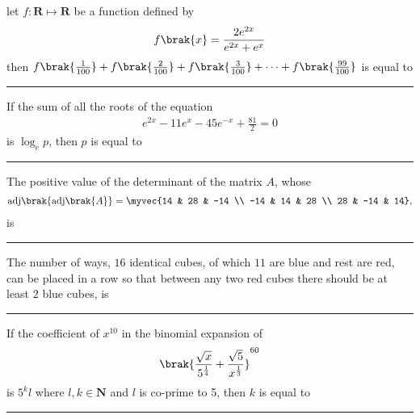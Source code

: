 \iffalse
\title{Assignment-2}
\author{EE24BTECH11049-Patnam Shariq Faraz Muhammed}
\section{integer}
\fi

%

    \item 
    let $f: \mathbf{R} \mapsto \mathbf{R}$ be a function defined by 
    \begin{align*}
        f\brak{x} = \frac{2e^{2x}}{e^{2x} + e^{x}}
    \end{align*}
    then $f\brak{\frac{1}{100}} + f\brak{\frac{2}{100}} + f\brak{\frac{3}{100}} + \dots + f\brak{\frac{99}{100}}$ is equal to \rule{1cm}{0.1pt}

    \hfill{}

    \item
    If the sum of all the roots of the equation 
    \begin{align*}
        e^{2x} - 11e^x - 45e^{-x} +\frac{81}{2}=0
    \end{align*}
    is $\log_e p$, then $p$ is equal to \rule{1cm}{0.1pt}

    \hfill{}

    \item 
    The positive value of the determinant of the matrix $A$, whose
    \begin{align*}
        \text{adj}\brak{\text{adj}\brak{A}} = \myvec{14 & 28 & -14 \\ -14 & 14 & 28 \\ 28 & -14 & 14},
    \end{align*}
    is \rule{1cm}{0.1pt}

    \hfill{}

    \item 
    The number of ways, $16$ identical cubes, of which $11$ are blue and rest are red, can be placed in a row so that between any two red cubes there should be at least $2$ blue cubes, is \rule{1cm}{0.1pt}

    \hfill{}

    \item 
    If the coefficient of $x^{10}$ in the binomial expansion of 
    \begin{align*}
        \brak{\frac{\sqrt{x}}{5^{\frac{1}{4}}} + \frac{\sqrt{5}}{x^{\frac{1}{3}}}}^{60}
    \end{align*}
    is $5^kl$ where $l,k \in \mathbf{N}$ and $l$ is co-prime to 5, then $k$ is equal to \rule{1cm}{0.1pt}

